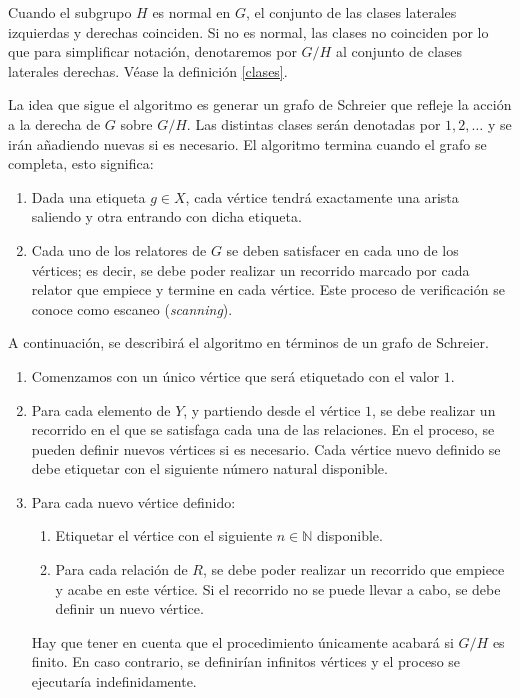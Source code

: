 \begin{remark}[Notación]
Cuando el subgrupo $H$ es normal en $G$, el conjunto de las clases laterales izquierdas y derechas coinciden. Si no es normal, las clases no coinciden por lo que para simplificar notación, denotaremos por $G/H$ al conjunto de clases laterales derechas. Véase la definición \ref{clases}.
\end{remark}




La idea que sigue el algoritmo es  generar un grafo de Schreier que refleje la acción a la derecha de $G$ sobre $G/H$.
Las distintas clases serán denotadas por $1,2, \ldots$  y se irán añadiendo nuevas si es necesario. El algoritmo termina cuando el grafo se completa, esto significa:
\begin{enumerate}

    \item Dada una etiqueta $g \in X$, cada vértice tendrá exactamente una arista saliendo y otra entrando con dicha etiqueta.
    \vspace{0.13cm}
    
    \item Cada uno de los relatores de $G$ se deben satisfacer en cada uno de los vértices; es decir, se debe poder realizar un recorrido marcado por cada relator que empiece y termine en cada vértice.  Este proceso de verificación se conoce como escaneo (\textit{scanning}).
\end{enumerate}



\newpage
A continuación, se describirá el algoritmo en términos de un grafo de Schreier. 
\begin{enumerate}
    \setlength\itemsep{0.15em}
    \item Comenzamos con un único vértice que será etiquetado con el valor $1$. 
    \item Para cada elemento de $Y$, y partiendo desde el vértice $1$, se debe realizar un recorrido en el que se satisfaga cada una de las relaciones. En el proceso, se pueden definir nuevos vértices si es necesario. Cada vértice nuevo definido se debe etiquetar con el siguiente número natural disponible.
    \item Para cada nuevo vértice definido:
    \begin{enumerate}
        \setlength\itemsep{0.15em}
        \item Etiquetar el vértice con el siguiente $n \in \mathbb{N}$ disponible.
        \item Para cada relación de $R$, se debe poder realizar un recorrido que empiece y acabe en este vértice. Si el recorrido no se puede llevar a cabo, se debe definir un nuevo vértice.
    \end{enumerate}
Hay que tener en cuenta que el procedimiento únicamente acabará si $G/H$ es finito. En caso contrario, se definirían infinitos vértices y el proceso se ejecutaría indefinidamente.
\end{enumerate}


